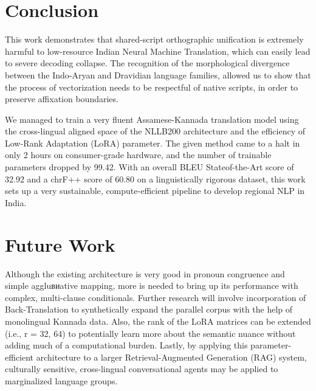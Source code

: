 \documentclass[conference]{IEEEtran}
\begin{document}
\section{Conclusion}
This work demonstrates that shared-script orthographic unification is extremely harmful to low-resource Indian Neural Machine Translation, which can easily lead to severe decoding collapse. The recognition of the morphological divergence between the Indo-Aryan and Dravidian language families, allowed us to show that the process of vectorization needs to be respectful of native scripts, in order to preserve affixation boundaries.

We managed to train a very fluent Assamese-Kannada translation model using the cross-lingual aligned space of the NLLB200 architecture and the efficiency of Low-Rank Adaptation (LoRA) parameter. The given method came to a halt in only 2 hours on consumer-grade hardware, and the number of trainable parameters dropped by 99.42. With an overall BLEU Stateof-the-Art score of 32.92 and a chrF++ score of 60.80 on a linguistically rigorous dataset, this work sets up a very sustainable, compute-efficient pipeline to develop regional NLP in India.
\section{Future Work}
Although the existing architecture is very good in pronoun congruence and simple aggluвиative mapping, more is needed to bring up its performance with complex, multi-clause conditionals. Further research will involve incorporation of Back-Translation to synthetically expand the parallel corpus with the help of monolingual Kannada data. Also, the rank of the LoRA matrices can be extended (i.e., r = 32, 64) to potentially learn more about the semantic nuance without adding much of a computational burden. Lastly, by applying this parameter-efficient architecture to a larger Retrieval-Augmented Generation (RAG) system, culturally sensitive, cross-lingual conversational agents may be applied to marginalized language groups.
\end{document}
